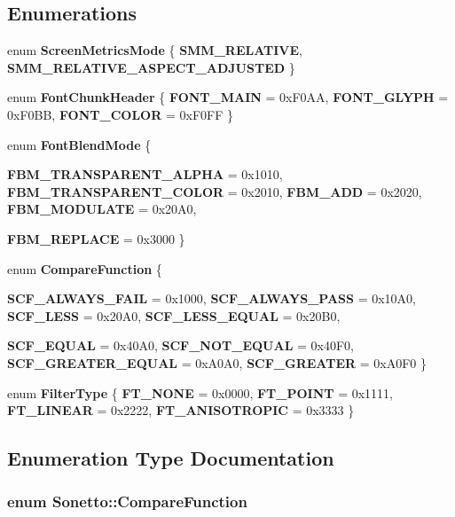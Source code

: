 \subsection*{Enumerations}
\begin{CompactItemize}
\item 
enum {\bf ScreenMetricsMode} \{ {\bf SMM\_\-RELATIVE}, 
{\bf SMM\_\-RELATIVE\_\-ASPECT\_\-ADJUSTED}
 \}
\item 
enum {\bf FontChunkHeader} \{ {\bf FONT\_\-MAIN} =  0xF0AA, 
{\bf FONT\_\-GLYPH} =  0xF0BB, 
{\bf FONT\_\-COLOR} =  0xF0FF
 \}
\item 
enum {\bf FontBlendMode} \{ \par
{\bf FBM\_\-TRANSPARENT\_\-ALPHA} =  0x1010, 
{\bf FBM\_\-TRANSPARENT\_\-COLOR} =  0x2010, 
{\bf FBM\_\-ADD} =  0x2020, 
{\bf FBM\_\-MODULATE} =  0x20A0, 
\par
{\bf FBM\_\-REPLACE} =  0x3000
 \}
\item 
enum {\bf CompareFunction} \{ \par
{\bf SCF\_\-ALWAYS\_\-FAIL} =  0x1000, 
{\bf SCF\_\-ALWAYS\_\-PASS} =  0x10A0, 
{\bf SCF\_\-LESS} =  0x20A0, 
{\bf SCF\_\-LESS\_\-EQUAL} =  0x20B0, 
\par
{\bf SCF\_\-EQUAL} =  0x40A0, 
{\bf SCF\_\-NOT\_\-EQUAL} =  0x40F0, 
{\bf SCF\_\-GREATER\_\-EQUAL} =  0xA0A0, 
{\bf SCF\_\-GREATER} =  0xA0F0
 \}
\item 
enum {\bf FilterType} \{ {\bf FT\_\-NONE} =  0x0000, 
{\bf FT\_\-POINT} =  0x1111, 
{\bf FT\_\-LINEAR} =  0x2222, 
{\bf FT\_\-ANISOTROPIC} =  0x3333
 \}
\end{CompactItemize}


\subsection{Enumeration Type Documentation}
\subsubsection{\setlength{\rightskip}{0pt plus 5cm}enum {\bf Sonetto::CompareFunction}}\label{namespace_sonetto_a806b8892799548a55f5e59e44902259}


